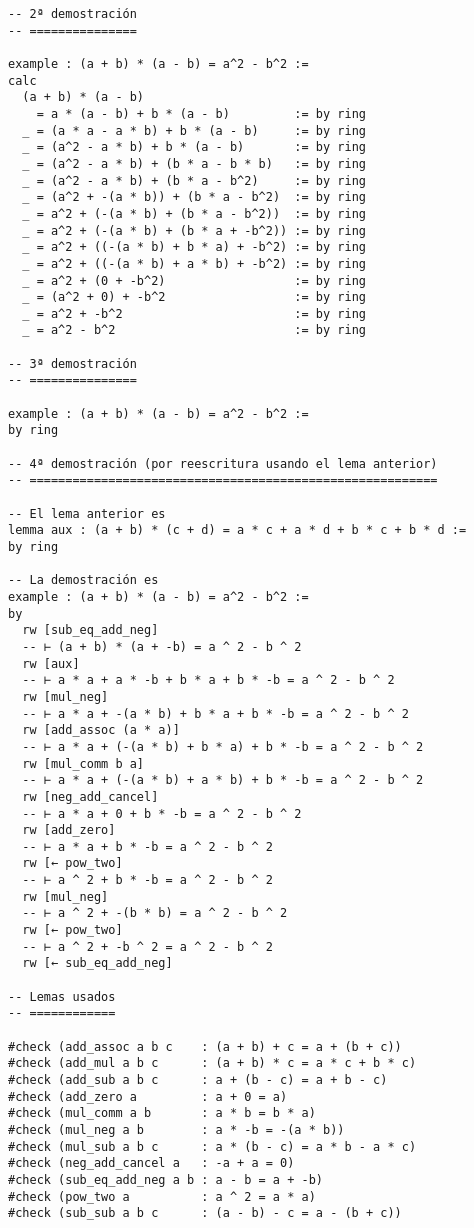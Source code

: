 \begin{verbatim}
-- 2ª demostración
-- ===============

example : (a + b) * (a - b) = a^2 - b^2 :=
calc
  (a + b) * (a - b)
    = a * (a - b) + b * (a - b)         := by ring
  _ = (a * a - a * b) + b * (a - b)     := by ring
  _ = (a^2 - a * b) + b * (a - b)       := by ring
  _ = (a^2 - a * b) + (b * a - b * b)   := by ring
  _ = (a^2 - a * b) + (b * a - b^2)     := by ring
  _ = (a^2 + -(a * b)) + (b * a - b^2)  := by ring
  _ = a^2 + (-(a * b) + (b * a - b^2))  := by ring
  _ = a^2 + (-(a * b) + (b * a + -b^2)) := by ring
  _ = a^2 + ((-(a * b) + b * a) + -b^2) := by ring
  _ = a^2 + ((-(a * b) + a * b) + -b^2) := by ring
  _ = a^2 + (0 + -b^2)                  := by ring
  _ = (a^2 + 0) + -b^2                  := by ring
  _ = a^2 + -b^2                        := by ring
  _ = a^2 - b^2                         := by ring

-- 3ª demostración
-- ===============

example : (a + b) * (a - b) = a^2 - b^2 :=
by ring

-- 4ª demostración (por reescritura usando el lema anterior)
-- =========================================================

-- El lema anterior es
lemma aux : (a + b) * (c + d) = a * c + a * d + b * c + b * d :=
by ring

-- La demostración es
example : (a + b) * (a - b) = a^2 - b^2 :=
by
  rw [sub_eq_add_neg]
  -- ⊢ (a + b) * (a + -b) = a ^ 2 - b ^ 2
  rw [aux]
  -- ⊢ a * a + a * -b + b * a + b * -b = a ^ 2 - b ^ 2
  rw [mul_neg]
  -- ⊢ a * a + -(a * b) + b * a + b * -b = a ^ 2 - b ^ 2
  rw [add_assoc (a * a)]
  -- ⊢ a * a + (-(a * b) + b * a) + b * -b = a ^ 2 - b ^ 2
  rw [mul_comm b a]
  -- ⊢ a * a + (-(a * b) + a * b) + b * -b = a ^ 2 - b ^ 2
  rw [neg_add_cancel]
  -- ⊢ a * a + 0 + b * -b = a ^ 2 - b ^ 2
  rw [add_zero]
  -- ⊢ a * a + b * -b = a ^ 2 - b ^ 2
  rw [← pow_two]
  -- ⊢ a ^ 2 + b * -b = a ^ 2 - b ^ 2
  rw [mul_neg]
  -- ⊢ a ^ 2 + -(b * b) = a ^ 2 - b ^ 2
  rw [← pow_two]
  -- ⊢ a ^ 2 + -b ^ 2 = a ^ 2 - b ^ 2
  rw [← sub_eq_add_neg]

-- Lemas usados
-- ============

#check (add_assoc a b c    : (a + b) + c = a + (b + c))
#check (add_mul a b c      : (a + b) * c = a * c + b * c)
#check (add_sub a b c      : a + (b - c) = a + b - c)
#check (add_zero a         : a + 0 = a)
#check (mul_comm a b       : a * b = b * a)
#check (mul_neg a b        : a * -b = -(a * b))
#check (mul_sub a b c      : a * (b - c) = a * b - a * c)
#check (neg_add_cancel a   : -a + a = 0)
#check (sub_eq_add_neg a b : a - b = a + -b)
#check (pow_two a          : a ^ 2 = a * a)
#check (sub_sub a b c      : (a - b) - c = a - (b + c))
\end{verbatim}

